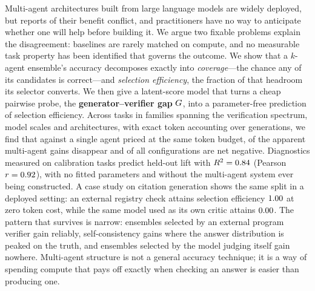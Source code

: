 Multi-agent architectures built from large language models are widely deployed,
but reports of their benefit conflict, and practitioners have no way to
anticipate whether one will help before building it. We argue two fixable
problems explain the disagreement: baselines are rarely matched on compute, and
no measurable task property has been identified that governs the outcome. We
show that a $k$-agent ensemble's accuracy decomposes exactly into
\emph{coverage}---the chance any of its candidates is correct---and
\emph{selection efficiency}, the fraction of that headroom its selector
converts. We then give a latent-score model that turns a cheap pairwise probe,
the \textbf{generator--verifier gap} $G$, into a parameter-free prediction of
selection efficiency. Across \nTasks{} tasks in \nFamilies{} families spanning
the verification spectrum, \nModels{} model scales and \nArch{} architectures,
with exact token accounting over \nGenerations{} generations, we find that
against a single agent priced at the same token budget, \nFlip{} of the apparent
multi-agent gains disappear and \fracMatchedNegative{} of all configurations are
net negative. Diagnostics measured on \nCalib{} calibration tasks predict held-out lift with
$R^2=0.84{}$ (Pearson $r=0.92{}$), with no fitted parameters and
without the multi-agent system ever being constructed. A case study on citation generation shows the same split in a deployed setting:
an external registry check attains selection efficiency $1.00{}$ at zero
token cost, while the same model used as its own critic attains
$0.00{}$. The pattern that survives is narrow: ensembles selected by an external program
verifier gain reliably, self-consistency gains where the answer distribution is
peaked on the truth, and ensembles selected by the model judging itself gain
nowhere. Multi-agent structure is not a general accuracy technique; it is a way
of spending compute that pays off exactly when checking an answer is easier
than producing one.
